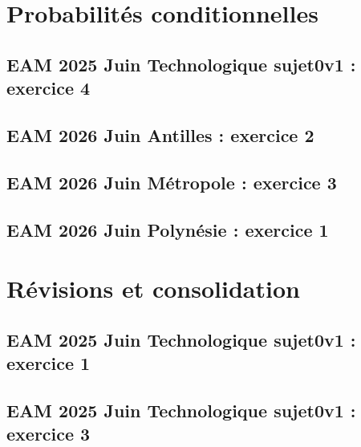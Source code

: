 \documentclass[lang=fr,edition=teacher,layout=sheet]{mxbook}
\begin{document}
\clearpage\section*{Probabilités conditionnelles}
\subsection*{EAM 2025 Juin Technologique sujet0v1 : exercice 4}
\begingroup\endgroup
\par\bigskip
{}\subsection*{EAM 2026 Juin Antilles : exercice 2}
\begingroup\endgroup
\par\bigskip
{}\subsection*{EAM 2026 Juin Métropole : exercice 3}
\begingroup\endgroup
\par\bigskip
{}\subsection*{EAM 2026 Juin Polynésie : exercice 1}
\begingroup\endgroup
\par\bigskip
\clearpage\section*{Révisions et consolidation}
\subsection*{EAM 2025 Juin Technologique sujet0v1 : exercice 1}
\begingroup\endgroup
\par\bigskip
{}\subsection*{EAM 2025 Juin Technologique sujet0v1 : exercice 3}
\end{document}
